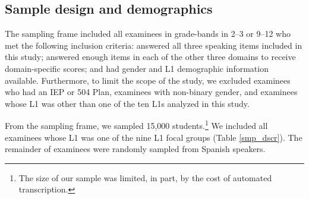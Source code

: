 \documentclass [PhD] {uclathes}
\begin{document}
\subsection{Sample design and demographics}

The sampling frame included all examinees in grade-bands in 2–3 or 9–12 who met the following inclusion criteria: answered all three speaking items included in this study; answered enough items in each of the other three domains to receive domain-specific scores; and had gender and L1 demographic information available. Furthermore, to limit the scope of the study, we excluded examinees who had an IEP or 504 Plan, examinees with non-binary gender, and examinees whose L1 was other than one of the ten L1s analyzed in this study. 

From the sampling frame, we sampled 15,000 students.\footnote{The size of our sample was limited, in part, by the cost of automated transcription.} We included all examinees whose L1 was one of the nine L1 focal groups (Table \ref{smp_dscr}). The remainder of examinees were randomly sampled from Spanish speakers. 
\end{document}
